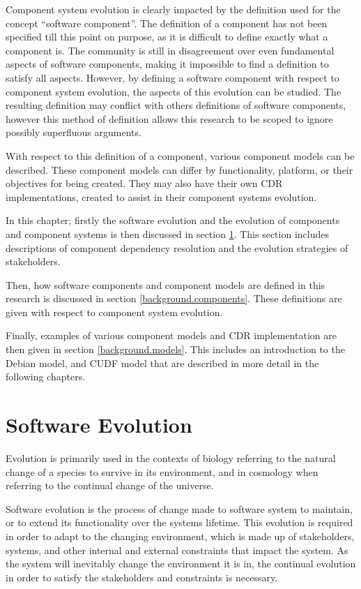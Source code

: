 Component system evolution is clearly impacted by the definition used for the concept ``software component''.
The definition of a component has not been specified till this point on purpose, as it is difficult to define exactly what a component is. 
The community is still in disagreement over even fundamental aspects of software components, making it impossible to find a definition to satisfy all aspects.
However, by defining a software component with respect to component system evolution, the aspects of this evolution can be studied.
The resulting definition may conflict with others definitions of software components, 
however this method of definition allows this research to be scoped to ignore possibly superfluous arguments.

With respect to this definition of a component, various component models can be described.
These component models can differ by functionality, platform, or their objectives for being created.
They may also have their own CDR implementations, created to assist in their component systems evolution. 

In this chapter; firstly the software evolution and the evolution of components and component systems is then discussed in section \ref{background.evolution}.
This section includes descriptions of component dependency resolution and the evolution strategies of stakeholders.

Then, how software components and component models are defined in this research is discussed in section \ref{background.components}.
These definitions are given with respect to component system evolution.

Finally, examples of various component models and CDR implementation are then given in section \ref{background.models}.
This includes an introduction to the Debian model, and CUDF model that are described in more detail in the following chapters.

\section{Software Evolution}
\label{background.evolution}
Evolution is primarily used in the contexts of biology referring to the natural change of a species to survive in its environment,
and in cosmology when referring to the continual change of the universe.

Software evolution is the process of change made to software system to maintain, or to extend its functionality over the systems lifetime.
This evolution is required in order to adapt to the changing environment, which is made up of stakeholders, systems, and other internal and external constraints that impact the system. 
As the system will inevitably change the environment it is in, the continual evolution in order to satisfy the stakeholders and constraints is necessary. 

